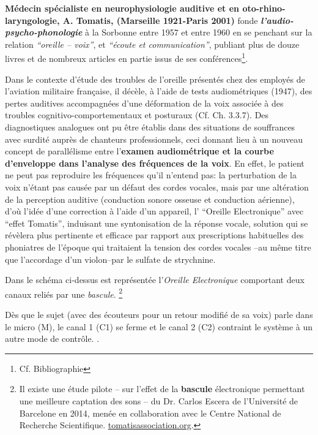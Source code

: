 \textbf{Médecin spécialiste en neurophysiologie auditive et en
oto-rhino-laryngologie, A. Tomatis, (Marseille 1921-Paris 2001) } fonde
\textit{\textbf{l'audio-psycho-phonologie }} à la Sorbonne entre 
1957 et entre 1960 en  se penchant sur la relation 
\textit{``oreille -- voix''}, et  \textit{``écoute
et communication''}, publiant plus de douze livres et de nombreux
articles en partie issus de ses
conférences\footnote{Cf. Bibliographie}.


Dans le contexte d'étude des troubles de
l'oreille présentés chez des employés de l'aviation militaire
française, il décèle, à l'aide
de tests audiométriques
 (1947), des pertes auditives accompagnées d'une
déformation de la voix associée à des troubles
cognitivo-comportementaux et posturaux (Cf. Ch. 3.3.7).
Des diagnostiques analogues ont pu être établis dans des situations
de souffrances avec surdité auprès de chanteurs professionnels,
ceci donnant lieu
à un nouveau concept de
parallélisme entre l'\textbf{examen audiométrique et la courbe
d'enveloppe dans l'analyse des fréquences de la voix}.
En effet, le patient ne peut pas reproduire les fréquences qu'il
n'entend pas: 
la perturbation de la voix n'étant pas causée par un défaut des cordes
vocales, mais par une altération de la perception auditive (conduction
sonore osseuse et conduction aérienne), d'où
l'idée d'une correction à l'aide d'un appareil, l' ``Oreille
Electronique'' avec ``effet Tomatis'', induisant
une syntonisation de la réponse vocale, solution qui se révèlera plus pertinente et efficace par rapport aux prescriptions habituelles des phoniatres de
l'époque qui traitaient la tension des cordes vocales --au même titre que
l'accordage d'un violon--par le sulfate de
strychnine.

Dans le schéma ci-dessus est représentée l'\textit{Oreille Electronique}
comportant deux canaux reliés par une
\textit{bascule}. \autocite{escera-key}\footnote{Il existe une étude pilote -- sur l'effet de la \textbf{bascule} \label{bascule} électronique permettant une meilleure
captation des sons -- du Dr. Carlos Escera
de l'Université de Barcelone en 2014, menée en collaboration avec le
Centre National de Recherche Scientifique.
\href{http://tomatisassociation.org/scientific-validation-of-the-tomatis-effect-
eeg-recordings-of-sound-from-brainstem-to-cerebral-cortex-encoding-university-of
-barcelona-2014/}{tomatisassociation.org}.}

Dès que le sujet (avec
des écouteurs pour un retour modifié de sa voix) parle
dans le micro (M), le canal 1 (C1) se ferme et  le canal 2 (C2) contraint le
système à un autre mode de contrôle.
.

